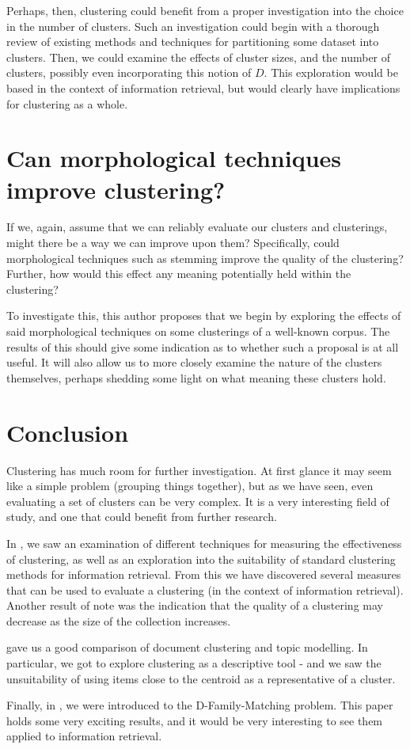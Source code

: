 \documentclass[sigconf,authorversion,nonacm]{acmart}
\begin{document}
Perhaps, then, clustering could benefit from a proper investigation into the choice in the number of clusters. Such an investigation could begin with a thorough review of existing methods and techniques for partitioning some dataset into clusters. Then, we could examine the effects of cluster sizes, and the number of clusters, possibly even incorporating this notion of $D$. This exploration would be based in the context of information retrieval, but would clearly have implications for clustering as a whole.
\section{Can morphological techniques improve clustering?}
If we, again, assume that we can reliably evaluate our clusters and clusterings, might there be a way we can improve upon them? Specifically, could morphological techniques such as stemming improve the quality of the clustering? Further, how would this effect any meaning potentially held within the clustering?

To investigate this, this author proposes that we begin by exploring the effects of said morphological techniques on some clusterings of a well-known corpus. The results of this should give some indication as to whether such a proposal is at all useful. It will also allow us to more closely examine the nature of the clusters themselves, perhaps shedding some light on what meaning these clusters hold.
\section{Conclusion}
Clustering has much room for further investigation. At first glance it may seem like a simple problem (grouping things together), but as we have seen, even evaluating a set of clusters can be very complex. It is a very interesting field of study, and one that could benefit from further research.

In \cite{Yuan2022}, we saw an examination of different techniques for measuring the effectiveness of clustering, as well as an exploration into the suitability of standard clustering methods for information retrieval. From this we have discovered several measures that can be used to evaluate a clustering (in the context of information retrieval). Another result of note was the indication that the quality of a clustering may decrease as the size of the collection increases.

\cite{Yuan2021} gave us a good comparison of document clustering and topic modelling. In particular, we got to explore clustering as a descriptive tool - and we saw the unsuitability of using items close to the centroid as a representative of a cluster.

Finally, in \cite{Cazals2019}, we were introduced to the D-Family-Matching problem. This paper holds some very exciting results, and it would be very interesting to see them applied to information retrieval.
\section*{}


\end{document}
